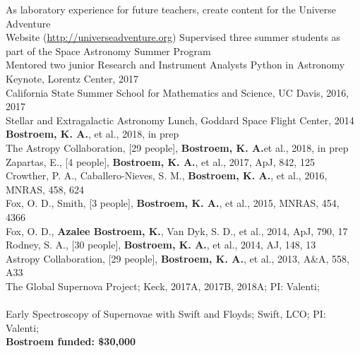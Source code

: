 \documentclass[10pt]{cv}
\begin{document}
\begin{llist}
\hspace*{24pt}As laboratory experience for future teachers, create content for the Universe Adventure \\
\hspace*{24pt}Website ({\color{blue}\url{http://universeadventure.org}}) 
%
Supervised three summer students as part of the Space Astronomy Summer Program \\
Mentored two junior Research and Instrument Analysts
%
Python in Astronomy Keynote, Lorentz Center, 2017\\
California State Summer School for Mathematics and Science, UC Davis, 2016, 2017\\
Stellar and Extragalactic Astronomy Lunch, Goddard Space Flight Center, 2014
%
{\bf Bostroem, K. A.}, et al., 2018, in prep\\
The Astropy Collaboration, [29 people], {\bf Bostroem, K. A.}et al., 2018, in prep\\
Zapartas, E., [4 people], {\bf Bostroem, K. A.}, et al., 2017, ApJ, 842, 125\\
Crowther, P. A., Caballero-Nieves, S. M., {\bf Bostroem, K. A.}, et al., 2016, MNRAS, 458, 624\\
Fox, O. D., Smith, [3 people], {\bf Bostroem, K. A.}, et al., 2015, MNRAS, 454, 4366\\
Fox, O. D., {\bf Azalee Bostroem, K.}, Van Dyk, S. D., et al., 2014, ApJ, 790, 17\\
Rodney, S. A., [30 people], {\bf Bostroem, K. A.}, et al., 2014, AJ, 148, 13\\
Astropy Collaboration, [29 people], {\bf Bostroem, K. A.}, et al., 2013, A\&A, 558, A33 \\
%
The Global Supernova Project; Keck, 2017A, 2017B, 2018A; PI: Valenti; \\
\hspace*{24pt}{\bf CoI: K. A. Bostroem} \\
Early Spectroscopy of Supernovae with Swift and Floyds; Swift, LCO; PI: Valenti; \\
\hspace*{24pt} {\bf Bostroem funded: \$30,000} \\

\end{llist}
\end{document}
